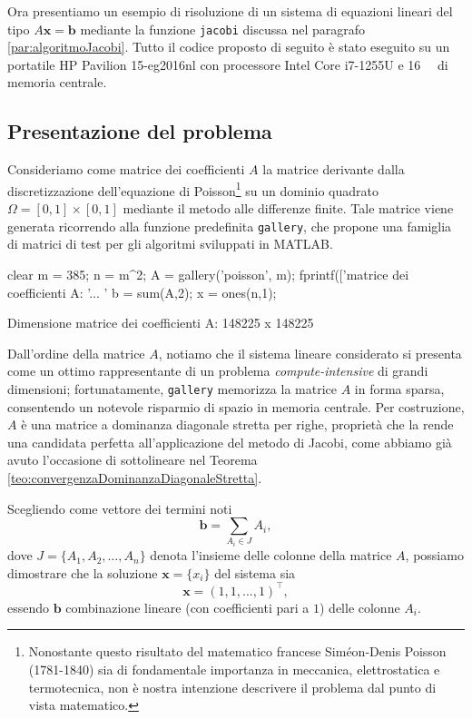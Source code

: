 Ora presentiamo un esempio di risoluzione di un sistema di equazioni lineari del tipo $A\mathbf{x}=\mathbf{b}$ mediante la funzione
\lstinline{jacobi} discussa nel paragrafo \ref{par:algoritmoJacobi}. \newline
Tutto il codice proposto di seguito \`e stato eseguito su un portatile HP Pavilion 15-eg2016nl con processore Intel Core i7-1255U e \qty{16}{\giga\byte} di memoria centrale.
\subsection{Presentazione del problema}
Consideriamo come matrice dei coefficienti $A$ la matrice derivante dalla discretizzazione dell'equazione di Poisson\footnote{
    Nonostante questo risultato del matematico francese Sim\'eon-Denis Poisson (1781-1840) sia di fondamentale importanza in meccanica,
    elettrostatica e termotecnica, non \`e nostra intenzione descrivere il problema dal punto di vista matematico.} su un
dominio quadrato $\Omega=[0, 1]\times[0, 1]$ mediante il metodo alle differenze finite.
Tale matrice viene generata ricorrendo alla funzione predefinita \lstinline{gallery}, che propone una famiglia di matrici di test per gli algoritmi sviluppati in MATLAB.
\begin{matlabcode}
    clear
    m = 385;
    n = m^2;
    A = gallery('poisson', m);
    fprintf(['\nDimensione matrice dei coefficienti A: '...
             '%
    b = sum(A,2);
    x = ones(n,1);
\end{matlabcode}
\begin{matlaboutput}
    Dimensione matrice dei coefficienti A: 148225 x 148225
\end{matlaboutput}
Dall'ordine della matrice $A$, notiamo che il sistema lineare considerato si presenta come un ottimo rappresentante
di un problema \textit{compute-intensive} di grandi dimensioni; fortunatamente, \lstinline{gallery} memorizza la matrice $A$ in
forma sparsa, consentendo un notevole risparmio di spazio in memoria centrale.\newline
Per costruzione, $A$ \`e una matrice a dominanza diagonale stretta per righe, propriet\`a che la rende una candidata
perfetta all'applicazione del metodo di Jacobi, come abbiamo gi\`a avuto l'occasione di sottolineare nel Teorema
\ref{teo:convergenzaDominanzaDiagonaleStretta}.

Scegliendo come vettore dei termini noti
\begin{equation*}
    \mathbf{b} = \sum_ {A_{i} \in J} A_{i},
\end{equation*}
dove $J = \{A_{1}, A_{2},\dots,A_{n}\}$ denota l'insieme delle colonne della matrice $A$, possiamo dimostrare che la soluzione $\mathbf{x}=\{{x}_{i}\}$ 
del sistema sia
\begin{equation*}
    \mathbf{x} = (1, 1, ..., 1)^\top,
\end{equation*}
essendo $\mathbf{b}$ combinazione lineare (con coefficienti pari a $\num{1}$) delle colonne $A_{i}$.
